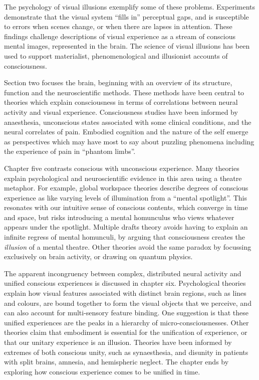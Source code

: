 \documentclass[a4paper]{article}
\begin{document}
The psychology of visual illusions exemplify some of these problems.
Experiments demonstrate that the visual system ``fills in'' perceptual gaps,
and is susceptible to errors when scenes change, or when there are lapses in
attention. These findings challenge descriptions of visual experience as a
stream of conscious mental images, represented in the brain. The science of
visual illusions has been used to support materialist, phenomenological and
illusionist accounts of consciousness.

Section two focuses the brain, beginning with an overview of its structure,
function and the neuroscientific methods. These methods have been central to
theories which explain consciousness in terms of correlations between neural
activity and visual experience. Consciousness studies have been informed by
anaesthesia, unconscious states associated with some clinical conditions, and
the neural correlates of pain. Embodied cognition and the nature of the self
emerge as perspectives which may have most to say about puzzling phenomena
including the experience of pain in ``phantom limbs''.

Chapter five contrasts conscious with unconscious experience. Many theories
explain psychological and neuroscientific evidence in this area using a
theatre metaphor. For example, global workspace theories describe degrees of
conscious experience as like varying levels of illumination from a ``mental
spotlight''. This resonates with our intuitive sense of conscious contents,
which converge in time and space, but risks introducing a mental homunculus
who views whatever appears under the spotlight. Multiple drafts theory avoids
having to explain an infinite regress of mental homunculi, by arguing that
consciousness creates the \textit{illusion} of a mental theatre. Other
theories avoid the same paradox by focussing exclusively on brain activity, or
drawing on quantum physics.

The apparent incongruency between complex, distributed neural activity and
unified conscious experiences is discussed in chapter six. Psychological
theories explain how visual features associated with distinct brain regions,
such as lines and colours, are bound together to form the visual objects that
we perceive, and can also account for multi-sensory feature binding. One
suggestion is that these unified experiences are the peaks in a hierarchy of
micro-consciousnesses. Other theories claim that embodiment is essential for 
the unification of experience, or that our unitary experience is an illusion.
Theories have been informed by extremes of both conscious unity, such as
synaesthesia, and disunity in patients with split brains, amnesia, and
hemispheric neglect. The chapter ends by exploring how conscious experience
comes to be unified in time.
\end{document}
